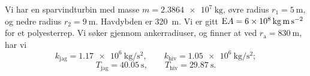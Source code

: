 Vi har en sparvindturbin med masse $m = \SI{2.3864e7}{\kilo\gram}$, øvre radius $r_1 = \SI{5}{\meter}$, og nedre radius $r_2 = \SI{9}{\meter}$.
Havdybden er \SI{320}{\meter}.
Vi er gitt $\mathrm{E} A = \SI{6e8}{\kilo\gram\meter\per\second\squared}$ for et polyesterrep.
Vi søker gjennom ankerradiuser, og finner at ved $r_{\mathrm{a}} = \SI{830}{\meter}$, har vi
\[
        k_{\mathrm{jag}} = \SI{1.17e6}{\kilo\gram\per\second\squared}, \qquad k_{\mathrm{hiv}} = \SI{1.05e6}{\kilo\gram\per\second\squared};
\]
\[
        T_{\mathrm{jag}} = \SI{40.05}{\second}, \qquad T_{\mathrm{hiv}} = \SI{29.87}{\second}.
\]

